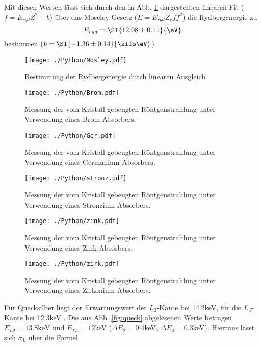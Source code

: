 Mit diesen Werten lässt sich durch den in Abb. \ref{fig:moseley} dargestellten linearen Fit ($f=E_{ryd} Z^2 +b$) über das Moseley-Gesetz ($E = E_{ryd} Z_eff^2$) die Rydbergenergie zu
\begin{equation*}
  E_{ryd} = \SI{12.08 \pm 0.11}{\eV}
\end{equation*}
bestimmen ($b= \SI{-1.36 \pm 0.14}{\kilo \eV}$).

\begin{figure}
  \centering
  \texttt{[image: ./Python/Mosley.pdf]}
  \caption{Bestimmung der Rydbergenergie durch linearen Ausgleich}
  \label{fig:moseley}
\end{figure}

\begin{figure}
  \centering
  \texttt{[image: ./Python/Brom.pdf]}
  \caption{Messung der vom Kristall gebeugten Röntgenstrahlung unter Verwendung eines Brom-Absorbers.}
  \label{fig:brom}
\end{figure}


\begin{figure}
  \centering
  \texttt{[image: ./Python/Ger.pdf]}
  \caption{Messung der vom Kristall gebeugten Röntgenstrahlung unter Verwendung eines Germanium-Absorbers.}
  \label{fig:ger}
\end{figure}


\begin{figure}
  \centering
  \texttt{[image: ./Python/stronz.pdf]}
  \caption{Messung der vom Kristall gebeugten Röntgenstrahlung unter Verwendung eines Stronzium-Absorbers.}
  \label{fig:stronz}
\end{figure}



\begin{figure}
  \centering
  \texttt{[image: ./Python/zink.pdf]}
  \caption{Messung der vom Kristall gebeugten Röntgenstrahlung unter Verwendung eines Zink-Absorbers.}
  \label{fig:zink}
\end{figure}



\begin{figure}
  \centering
  \texttt{[image: ./Python/zirk.pdf]}
  \caption{Messung der vom Kristall gebeugten Röntgenstrahlung unter Verwendung eines Zirkonium-Absorbers.}
  \label{fig:brom}
\end{figure}

Für Quecksilber liegt der Erwartungswert der $L_2$-Kante bei 14.2keV, für die $L_3$-Kante bei 12.3keV \cite{skuld}. Die aus Abb. \ref{fig:queck} abgelesenen Werte betragen $E_{L2} = 13.8 \si{\kilo \eV}$ und $E_{L3} = 12$keV ($\Delta E_2 = 0.4$keV, $\Delta E_3 = 0.3$keV).
Hierraus lässt sich $\sigma_L$ über die Formel

